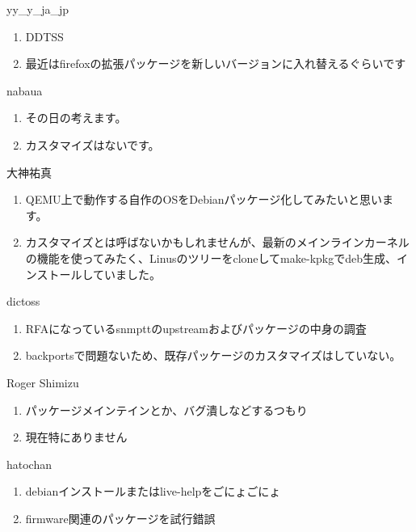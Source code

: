 \begin{prework}{ yy\_y\_ja\_jp }
  \begin{enumerate}
  \item DDTSS
  \item 最近はfirefoxの拡張パッケージを新しいバージョンに入れ替えるぐらいです
  \end{enumerate}
\end{prework}

\begin{prework}{ nabaua }
  \begin{enumerate}
  \item その日の考えます。
  \item カスタマイズはないです。
  \end{enumerate}
\end{prework}

\begin{prework}{ 大神祐真 }
  \begin{enumerate}
  \item QEMU上で動作する自作のOSをDebianパッケージ化してみたいと思います。
  \item カスタマイズとは呼ばないかもしれませんが、最新のメインラインカーネルの機能を使ってみたく、Linusのツリーをcloneしてmake-kpkgでdeb生成、インストールしていました。
  \end{enumerate}
\end{prework}

\begin{prework}{ dictoss }
  \begin{enumerate}
  \item RFAになっているsnmpttのupstreamおよびパッケージの中身の調査
  \item backportsで問題ないため、既存パッケージのカスタマイズはしていない。
  \end{enumerate}
\end{prework}

\begin{prework}{ Roger Shimizu }
  \begin{enumerate}
  \item パッケージメインテインとか、バグ潰しなどするつもり
  \item 現在特にありません
  \end{enumerate}
\end{prework}

\begin{prework}{ hatochan }
  \begin{enumerate}
  \item debianインストールまたはlive-helpをごにょごにょ
  \item firmware関連のパッケージを試行錯誤
  \end{enumerate}
\end{prework}

